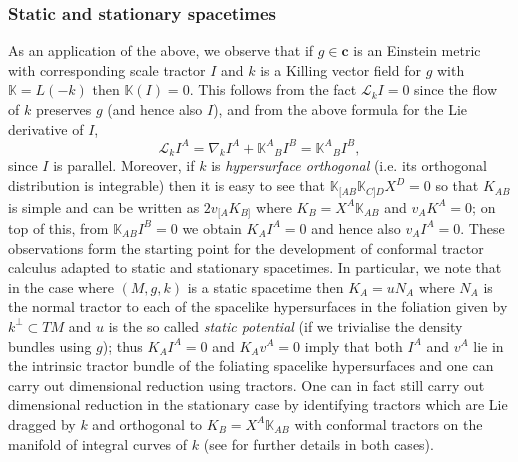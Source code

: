 \documentclass[a4paper,12pt]{amsart}
\newcommand{\cc}{\boldsymbol{c}}
\theoremstyle{remark}
\begin{document}
\subsubsection{Static and stationary spacetimes} As an application of the above, we observe that if $g\in\cc$ is an Einstein metric with corresponding scale tractor $I$ and $k$ is a Killing vector field for $g$ with $\mathbb{K}=L(-k)$ then $\mathbb{K}(I)=0$. This follows from the fact $\mathcal{L}_k I=0$ since the flow of $k$ preserves $g$ (and hence also $I$), and from the above formula for the Lie derivative of $I$,
$$
\mathcal{L}_k I^A = \nabla_k I^A + \mathbb{K}^A{_B}I^B = \mathbb{K}^A{_B}I^B,
$$ 
since $I$ is parallel. Moreover, if $k$ is \emph{hypersurface orthogonal} (i.e. its orthogonal distribution is integrable) then it is easy to see that $\mathbb{K}_{[AB}\mathbb{K}_{C]D}X^D=0$ so that $K_{AB}$ is simple and can be written as $2v_{[A} K_{B]}$ where $K_B=X^A\mathbb{K}_{AB}$ and $v_A K^A =0$; on top of this, from $\mathbb{K}_{AB}I^B=0$ we obtain $K_A I^A=0$ and hence also $v_A I^A =0$. These observations form the starting point for the development of conformal tractor calculus adapted to static and stationary spacetimes. In particular, we note that in the case where $(M,g,k)$ is a static spacetime then $K_A = u N_A$ where $N_A$ is the normal tractor to each of the spacelike hypersurfaces in the foliation given by $k^\perp \subset TM$ and $u$ is the so called \emph{static potential} (if we trivialise the density bundles using $g$); thus $K_A I^A=0$ and $K_A v^A =0$ imply that both $I^A$ and $v^A$ lie in the intrinsic tractor bundle of the foliating spacelike hypersurfaces and one can carry out dimensional reduction using tractors. One can in fact still carry out dimensional reduction in the stationary case by identifying tractors which are Lie dragged by $k$ and orthogonal to $K_B=X^A\mathbb{K}_{AB}$ with conformal tractors on the manifold of integral curves of $k$ (see \cite{SeanMSc} for further details in both cases).
\end{document}
